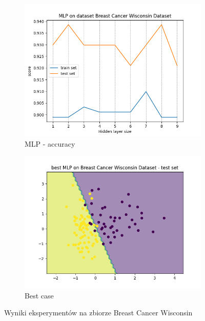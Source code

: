 \documentclass[12pt]{article}
\newcommand*{\subfigwidth}{0.24\textwidth}
\begin{document}
\begin{figure}[H]
\begin{subfigure}[t]{\subfigwidth}
        \includegraphics[width=\linewidth]{img/other_datasets/mlp/breast_accuracy.png}
        \caption{MLP - accuracy}
    \end{subfigure}
    \hfill
    \begin{subfigure}[t]{\subfigwidth}
        \includegraphics[width=\linewidth]{img/other_datasets/mlp/breast_best_boundary_test.png}
        \caption{Best case}
    \end{subfigure}
    \caption{Wyniki eksperymentów na zbiorze Breast Cancer Wisconsin}
\end{figure}
\end{document}
